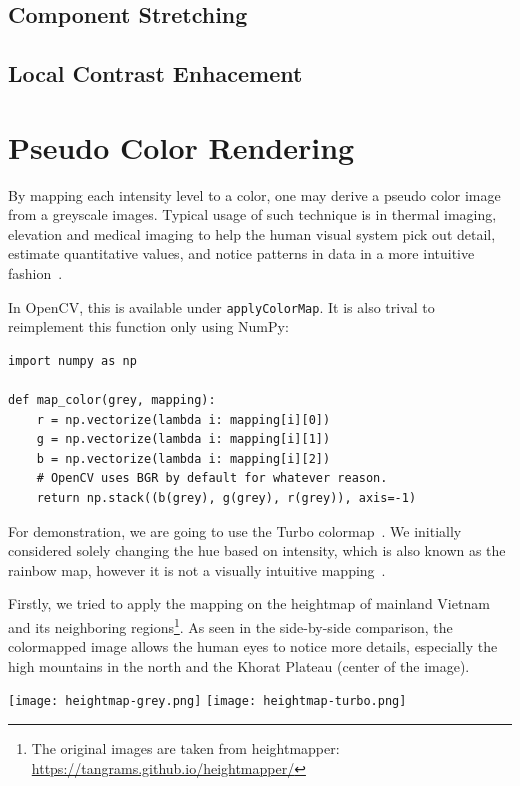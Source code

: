 \documentclass[a4paper,12pt]{article}
\begin{document}
\subsection{Component Stretching}

\subsection{Local Contrast Enhacement}

\section{Pseudo Color Rendering}
By mapping each intensity level to a color, one may derive a pseudo color image
from a greyscale images.  Typical usage of such technique is in thermal imaging,
elevation and medical imaging to help the human visual system pick out detail,
estimate quantitative values, and notice patterns in data in a more intuitive
fashion~\cite{turbo}.

In OpenCV, this is available under \verb|applyColorMap|.  It is also trival
to reimplement this function only using NumPy:
\begin{verbatim}
import numpy as np

def map_color(grey, mapping):
    r = np.vectorize(lambda i: mapping[i][0])
    g = np.vectorize(lambda i: mapping[i][1])
    b = np.vectorize(lambda i: mapping[i][2])
    # OpenCV uses BGR by default for whatever reason.
    return np.stack((b(grey), g(grey), r(grey)), axis=-1)
\end{verbatim}

For demonstration, we are going to use the Turbo colormap~\cite{turbo}.
We initially considered solely changing the hue based on intensity,
which is also known as the rainbow map, however it is not a visually
intuitive mapping~\cite{rainbowbad}.

Firstly, we tried to apply the mapping on the heightmap of mainland Vietnam and
its neighboring regions\footnote{The original images are taken from
heightmapper: \url{https://tangrams.github.io/heightmapper/}}.  As seen in
the side-by-side comparison, the colormapped image allows the human eyes
to notice more details, especially the high mountains in the north and
the Khorat Plateau (center of the image).
\begin{center}
  \texttt{[image: heightmap-grey.png]}
  \texttt{[image: heightmap-turbo.png]}
\end{center}
\end{document}
